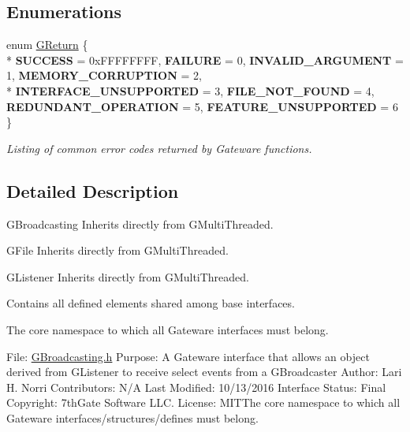\subsection*{Enumerations}
\begin{DoxyCompactItemize}
\item 
enum \hyperlink{namespaceGW_a67a839e3df7ea8a5c5686613a7a3de21}{G\+Return} \{ \\*
{\bfseries S\+U\+C\+C\+E\+SS} = 0x\+F\+F\+F\+F\+F\+F\+FF, 
{\bfseries F\+A\+I\+L\+U\+RE} = 0, 
{\bfseries I\+N\+V\+A\+L\+I\+D\+\_\+\+A\+R\+G\+U\+M\+E\+NT} = 1, 
{\bfseries M\+E\+M\+O\+R\+Y\+\_\+\+C\+O\+R\+R\+U\+P\+T\+I\+ON} = 2, 
\\*
{\bfseries I\+N\+T\+E\+R\+F\+A\+C\+E\+\_\+\+U\+N\+S\+U\+P\+P\+O\+R\+T\+ED} = 3, 
{\bfseries F\+I\+L\+E\+\_\+\+N\+O\+T\+\_\+\+F\+O\+U\+ND} = 4, 
{\bfseries R\+E\+D\+U\+N\+D\+A\+N\+T\+\_\+\+O\+P\+E\+R\+A\+T\+I\+ON} = 5, 
{\bfseries F\+E\+A\+T\+U\+R\+E\+\_\+\+U\+N\+S\+U\+P\+P\+O\+R\+T\+ED} = 6
 \}\hypertarget{namespaceGW_a67a839e3df7ea8a5c5686613a7a3de21}{}\label{namespaceGW_a67a839e3df7ea8a5c5686613a7a3de21}
\begin{DoxyCompactList}\small\item\em Listing of common error codes returned by Gateware functions. \end{DoxyCompactList}
\end{DoxyCompactItemize}


\subsection{Detailed Description}
G\+Broadcasting Inherits directly from G\+Multi\+Threaded. 

G\+File Inherits directly from G\+Multi\+Threaded.

G\+Listener Inherits directly from G\+Multi\+Threaded.

Contains all defined elements shared among base interfaces.

The core namespace to which all Gateware interfaces must belong.

File\+: \hyperlink{GBroadcasting_8h_source}{G\+Broadcasting.\+h} Purpose\+: A Gateware interface that allows an object derived from G\+Listener to receive select events from a G\+Broadcaster Author\+: Lari H. Norri Contributors\+: N/A Last Modified\+: 10/13/2016 Interface Status\+: Final Copyright\+: 7th\+Gate Software L\+LC. License\+: M\+I\+T\+The core namespace to which all Gateware interfaces/structures/defines must belong.

